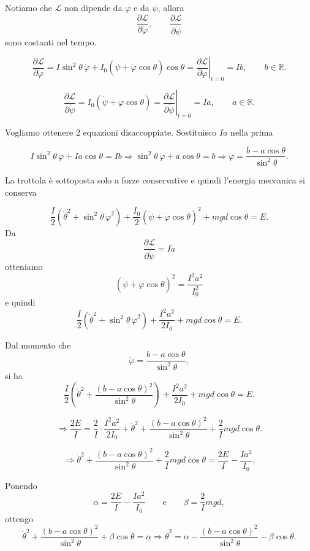 Notiamo che \(\mathcal{L}\) non dipende da \(\varphi\) e da \(\psi\), allora
\[
\frac{\partial \mathcal{L}}{\partial \dot{\varphi}},
\qquad
\frac{\partial \mathcal{L}}{\partial \dot{\psi}}
\]
sono costanti nel tempo.

\[
\frac{\partial \mathcal{L}}{\partial \dot{\varphi}}
=
I\sin^2\theta\,\dot{\varphi}
+
I_0
\left(
\dot{\psi}
+
\dot{\varphi}\cos\theta
\right)\cos\theta
=
\left.
\frac{\partial \mathcal{L}}{\partial \dot{\varphi}}
\right|_{t=0}
=
Ib,
\qquad b\in\mathbb{R}.
\]

\[
\frac{\partial \mathcal{L}}{\partial \dot{\psi}}
=
I_0
\left(
\dot{\psi}
+
\dot{\varphi}\cos\theta
\right)
=
\left.
\frac{\partial \mathcal{L}}{\partial \dot{\psi}}
\right|_{t=0}
=
Ia,
\qquad a\in\mathbb{R}.
\]

Vogliamo ottenere \(2\) equazioni disaccoppiate. Sostituisco \(Ia\) nella prima

\[
I\sin^2\theta\,\dot{\varphi}
+
Ia\cos\theta
=
Ib
\Rightarrow
\sin^2\theta\,\dot{\varphi}
+
a\cos\theta
=
b
\Rightarrow
\dot{\varphi}
=
\frac{b-a\cos\theta}{\sin^2\theta}.
\]

La trottola è sottoposta solo a forze conservative e quindi l'energia meccanica si conserva

\[
\frac{I}{2}
\left(
\dot{\theta}^2
+
\sin^2\theta\,\dot{\varphi}^2
\right)
+
\frac{I_0}{2}
\left(
\dot{\psi}
+
\dot{\varphi}\cos\theta
\right)^2
+
mgd\cos\theta
=
E.
\]
Da
\[
\frac{\partial \mathcal{L}}{\partial \dot{\psi}} = Ia
\]
otteniamo
\[
\left(\dot{\psi}+\dot{\varphi}\cos\theta\right)^2
=
\frac{I^2a^2}{I_0^2}
\]
e quindi
\[
\frac{I}{2}
\left(
\dot{\theta}^2+\sin^2\theta\,\dot{\varphi}^2
\right)
+
\frac{I^2a^2}{2I_0}
+
mgd\cos\theta
=
E.
\]

Dal momento che
\[
\dot{\varphi}
=
\frac{b-a\cos\theta}{\sin^2\theta},
\]
si ha
\[
\frac{I}{2}
\left(
\dot{\theta}^2
+
\frac{\left(b-a\cos\theta\right)^2}{\sin^2\theta}
\right)
+
\frac{I^2a^2}{2I_0}
+
mgd\cos\theta
=
E.
\]

\[
\Rightarrow
\frac{2E}{I}
=
\frac{2}{I}\cdot\frac{I^2a^2}{2I_0}
+
\dot{\theta}^2
+
\frac{\left(b-a\cos\theta\right)^2}{\sin^2\theta}
+
\frac{2}{I}mgd\cos\theta.
\]

\[
\Rightarrow
\dot{\theta}^2
+
\frac{\left(b-a\cos\theta\right)^2}{\sin^2\theta}
+
\frac{2}{I}mgd\cos\theta
=
\frac{2E}{I}
-
\frac{Ia^2}{I_0}.
\]

Ponendo
\[
\alpha
=
\frac{2E}{I}
-
\frac{Ia^2}{I_0}
\qquad
\text{e}
\qquad
\beta
=
\frac{2}{I}mgd,
\]
ottengo
\[
\dot{\theta}^2
+
\frac{\left(b-a\cos\theta\right)^2}{\sin^2\theta}
+
\beta\cos\theta
=
\alpha
\Rightarrow
\dot{\theta}^2
=
\alpha
-
\frac{\left(b-a\cos\theta\right)^2}{\sin^2\theta}
-
\beta\cos\theta.
\]

